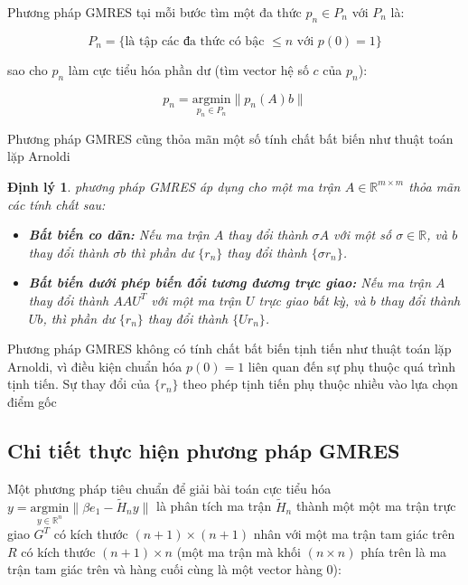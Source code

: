 \documentclass[14pt, a4paper]{article}
\numberwithin{equation}{section}
\numberwithin{algorithm}{section}
\numberwithin{figure}{section}
\newtheorem{dl}{Định lý}
\numberwithin{dl}{section}
\numberwithin{md}{section}
\numberwithin{bd}{section}
\numberwithin{dn}{section}
\numberwithin{hq}{section}
\begin{document}
Phương pháp GMRES tại mỗi bước tìm một đa thức $p_n \in P_n$ với $P_n$ là:

\begin{equation}
    P_n = \lbrace \text{là tập các đa thức có bậc } \leq n \text{ với } p(0)=1 \rbrace
\end{equation}

sao cho $p_n$ làm cực tiểu hóa phần dư (tìm vector hệ số $c$ của $p_n$):

\begin{equation} \label{eq:Find-Polynomial}
    p_n = \underset{p_n \in P_n}{\mathrm{argmin}} \lVert p_n(A)b \rVert
\end{equation}

Phương pháp GMRES cũng thỏa mãn một số tính chất bất biến như thuật toán lặp Arnoldi

\begin{dl}
    phương pháp GMRES áp dụng cho một ma trận $A \in \mathbb{R}^{m \times m}$ thỏa mãn các tính chất sau:

    \begin{itemize}
        \item \textbf{Bất biến co dãn:} Nếu ma trận $A$ thay đổi thành $\sigma A$ với một số $\sigma \in \mathbb{R}$, và $b$ thay đổi thành $\sigma b$ thì phần dư $\lbrace r_n \rbrace$ thay đổi thành $\lbrace \sigma r_n \rbrace$.
        \item \textbf{Bất biến dưới phép biến đổi tương đương trực giao:} Nếu ma trận $A$ thay đổi thành $A A U^T$ với một ma trận $U$ trực giao bất kỳ, và $b$ thay đổi thành $Ub$, thì phần dư $\lbrace r_n \rbrace$ thay đổi thành $\lbrace U r_n \rbrace$.
    \end{itemize}
\end{dl}

Phương pháp GMRES không có tính chất bất biến tịnh tiến như thuật toán lặp Arnoldi, vì điều kiện chuẩn hóa $p(0)=1$ liên quan đến sự phụ thuộc quá trình tịnh tiến. Sự thay đổi của $\lbrace r_n \rbrace$ theo phép tịnh tiến phụ thuộc nhiều vào lựa chọn điểm gốc

\subsection{Chi tiết thực hiện phương pháp GMRES}

Một phương pháp tiêu chuẩn để giải bài toán cực tiểu hóa $y = \underset{y \in \mathbb{R}^{n}}{\mathrm{argmin}} \lVert \beta e_1 - \widetilde{H}_n y \rVert$ là phân tích ma trận $\widetilde{H}_n$ thành một một ma trận trực giao $G^T$ có kích thước $(n+1) \times (n+1)$ nhân với một ma trận tam giác trên $R$ có kích thước $(n+1) \times n$ (một ma trận mà khối $(n \times n)$ phía trên là ma trận tam giác trên và hàng cuối cùng là một vector hàng 0):
\end{document}
